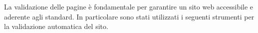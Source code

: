 La validazione delle pagine è fondamentale per garantire un sito web accessibile e aderente agli standard. In particolare sono stati utilizzati i seguenti strumenti per la validazione automatica del sito.